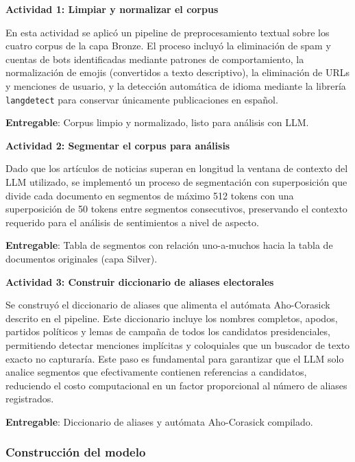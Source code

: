 \textbf{Actividad 1: Limpiar y normalizar el corpus}
 
En esta actividad se aplicó un pipeline de preprocesamiento textual sobre los cuatro corpus de la capa Bronze. El proceso incluyó la eliminación de spam y cuentas de bots identificadas mediante patrones de comportamiento, la normalización de emojis (convertidos a texto descriptivo), la eliminación de URLs y menciones de usuario, y la detección automática de idioma mediante la librería \texttt{langdetect} para conservar únicamente publicaciones en español.
 
\textbf{Entregable}: Corpus limpio y normalizado, listo para análisis con LLM.
 
\textbf{Actividad 2: Segmentar el corpus para análisis}
 
Dado que los artículos de noticias superan en longitud la ventana de contexto del LLM utilizado, se implementó un proceso de segmentación con superposición que divide cada documento en segmentos de máximo 512 tokens con una superposición de 50 tokens entre segmentos consecutivos, preservando el contexto requerido para el análisis de sentimientos a nivel de aspecto.
 
\textbf{Entregable}: Tabla de segmentos con relación uno-a-muchos hacia la tabla de documentos originales (capa Silver).
 
\textbf{Actividad 3: Construir diccionario de aliases electorales}
 
Se construyó el diccionario de aliases que alimenta el autómata Aho-Corasick descrito en el pipeline. Este diccionario incluye los nombres completos, apodos, partidos políticos y lemas de campaña de todos los candidatos presidenciales, permitiendo detectar menciones implícitas y coloquiales que un buscador de texto exacto no capturaría. Este paso es fundamental para garantizar que el LLM solo analice segmentos que efectivamente contienen referencias a candidatos, reduciendo el costo computacional en un factor proporcional al número de aliases registrados.
 
\textbf{Entregable}: Diccionario de aliases y autómata Aho-Corasick compilado.
 
\subsubsection{Construcción del modelo}
 
